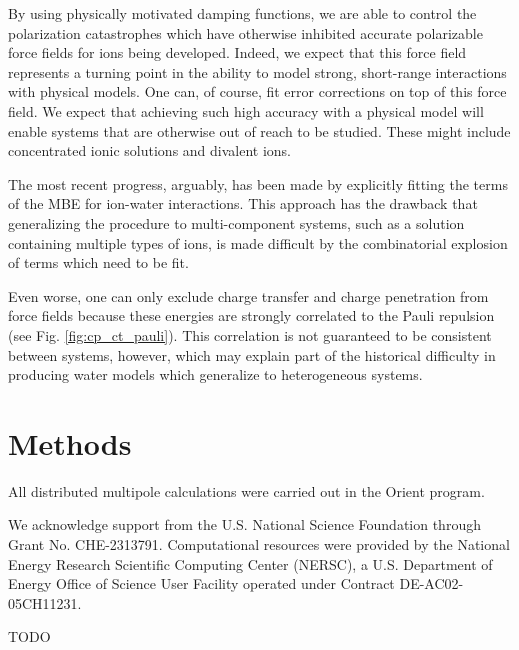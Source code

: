 \documentclass[journal=jctcce,manuscript=article]{achemso}
\begin{document}
By using physically motivated damping functions, we are able to control the polarization catastrophes which have otherwise inhibited accurate polarizable force fields for ions being developed. Indeed, we expect that this force field represents a turning point in the ability to model strong, short-range interactions with physical models. One can, of course, fit error corrections on top of this force field. We expect that achieving such high accuracy with a physical model will enable systems that are otherwise out of reach to be studied. These might include concentrated ionic solutions and divalent ions.

The most recent
progress, arguably, has been made by explicitly fitting the terms of the MBE for
ion-water interactions.\cite{zhuang2022hydration,caruso2022accurate} This approach
has the drawback that generalizing the procedure to multi-component systems,
such as a solution containing multiple types of ions, is made difficult by
the combinatorial explosion of terms which need to be fit.

Even worse, one can only
exclude charge transfer and charge penetration from force fields because
these energies are strongly correlated to the Pauli repulsion (see Fig. \ref{fig:cp_ct_pauli}).
This correlation is not guaranteed to be consistent between systems, however,
which may explain part of the historical difficulty in producing water models which
generalize to heterogeneous systems.

\section*{Methods}
All distributed multipole calculations were carried out
in the Orient program.\cite{stone2002orient}

\begin{acknowledgement}
We acknowledge support from the U.S. National Science Foundation through Grant No. CHE-2313791. Computational resources were provided by the National Energy Research Scientific Computing Center (NERSC), a U.S. Department of Energy Office of Science User Facility operated under Contract DE-AC02-05CH11231.
\end{acknowledgement}

\begin{suppinfo}

TODO

\end{suppinfo}


\end{document}
